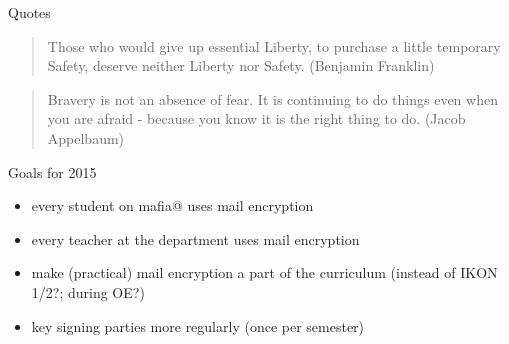 \documentclass{beamer}
\begin{document}
	\begin{frame}{Quotes}
		\begin{quotation}
			Those who would give up essential Liberty, to purchase a little temporary Safety, deserve neither Liberty nor Safety. (Benjamin Franklin)
		\end{quotation}
		
		\begin{quotation}
			Bravery is not an absence of fear. It is continuing to do things even when you are afraid - because you know it is the right thing to do. (Jacob Appelbaum)
		\end{quotation}
	\end{frame}
	
	\begin{frame}{Goals for 2015}
		\begin{itemize}
			\item every student on mafia@ uses mail encryption
			\item every teacher at the department uses mail encryption
			\item make (practical) mail encryption a part of the curriculum (instead of IKON 1/2?; during OE?)
			\item key signing parties more regularly (once per semester) 
		\end{itemize}
	\end{frame}
\end{document}
